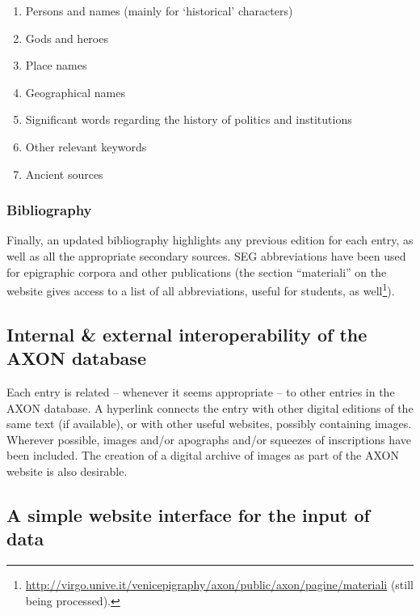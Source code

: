 \documentclass[amsthm,ebook]{saparticle}
\begin{document}
\begin{enumerate}
\item Persons and names (mainly for ‘historical’ characters)
\item Gods and heroes
\item Place names
\item Geographical names
\item Significant words regarding the history of politics and institutions
\item Other relevant keywords
\item Ancient sources
\end{enumerate}



\subsubsection{Bibliography}


Finally, an updated bibliography highlights any previous edition for each entry, as well as all the appropriate
secondary sources. SEG abbreviations have been used for epigraphic corpora and other publications (the section
``materiali'' on the website gives access to a list of all abbreviations, useful for students, as well\footnote{
\url{http://virgo.unive.it/venicepigraphy/axon/public/axon/pagine/materiali} (still being processed).}).




\subsection{Internal \& external interoperability of the AXON database}





Each entry is related – whenever it seems appropriate – to other entries in the AXON database. A hyperlink connects the
entry with other digital editions of the same text (if available), or with other useful websites, possibly containing
images. Wherever possible, images and/or apographs and/or squeezes of inscriptions have been included. The creation of
a digital archive of images as part of the AXON website is also desirable.




\subsection{A simple website interface for the input of data}
\end{document}
